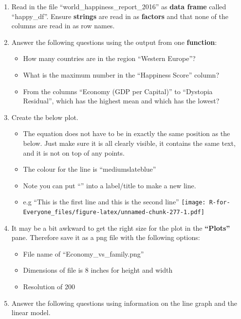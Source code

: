 \documentclass[]{book}
\providecommand{\tightlist}{%
  \setlength{\itemsep}{0pt}\setlength{\parskip}{0pt}}
\begin{document}
\begin{enumerate}
\def\labelenumi{\arabic{enumi}.}
\tightlist
\item
  Read in the file ``world\_happiness\_report\_2016'' as \textbf{data
  frame} called ``happy\_df''. Ensure \textbf{strings} are read in as
  \textbf{factors} and that none of the columns are read in as row
  names.
\item
  Answer the following questions using the output from one
  \textbf{function}:

  \begin{itemize}
  \tightlist
  \item
    How many countries are in the region ``Western Europe''?
  \item
    What is the maximum number in the ``Happiness Score'' column?
  \item
    From the columns ``Economy (GDP per Capital)'' to ``Dystopia
    Residual'', which has the highest mean and which has the lowest?
  \end{itemize}
\item
  Create the below plot.

  \begin{itemize}
  \tightlist
  \item
    The equation does not have to be in exactly the same position as the
    below. Just make sure it is all clearly visible, it contains the
    same text, and it is not on top of any points.
  \item
    The colour for the line is ``mediumslateblue''
  \item
    Note you can put ``\n'' into a label/title to make a new line.
  \item
    e.g ``This is the first line \n and this is the second line''
    \texttt{[image: R-for-Everyone\_files/figure-latex/unnamed-chunk-277-1.pdf]}
  \end{itemize}
\item
  It may be a bit awkward to get the right size for the plot in the
  \textbf{``Plots''} pane. Therefore save it as a png file with the
  following options:

  \begin{itemize}
  \tightlist
  \item
    File name of ``Economy\_vs\_family.png''
  \item
    Dimensions of file is 8 inches for height and width
  \item
    Resolution of 200
  \end{itemize}
\item
  Answer the following questions using information on the line graph and
  the linear model.


\end{enumerate}
\end{document}
